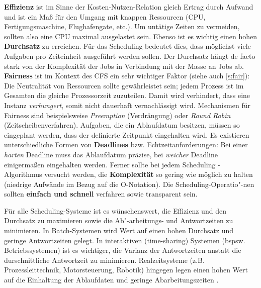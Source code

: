 \textbf{Effizienz} ist im Sinne der Kosten-Nutzen-Relation gleich Ertrag durch Aufwand und ist ein Maß für den Umgang mit knappen Ressourcen (CPU, Fertigungsmaschine, Flughafengate, etc.). Um untätige Zeiten zu vermeiden, sollten also eine CPU maximal ausgelastet sein. Ebenso ist es wichtig einen hohen \textbf{Durchsatz} zu erreichen. Für das Scheduling bedeutet dies, dass möglichst viele Aufgaben pro Zeiteinheit ausgeführt werden sollen. Der Durchsatz hängt de facto stark von der Komplexität der Jobs in Verbindung mit der Masse an Jobs ab. \textbf{Fairness} ist im Kontext des CFS ein sehr wichtiger Faktor (siehe auch \ref{s:fair}): Die Neutralität von Ressourcen sollte gewährleistet sein; jedem Prozess ist im Gesamten die gleiche Prozessorzeit zuzuteilen. Damit wird verhindert, dass eine Instanz \textit{verhungert}, somit nicht dauerhaft vernachlässigt wird. Mechanismen für Fairness sind beispielsweise \textit{Preemption} (Verdrängung) oder \textit{Round Robin} (Zeitscheibenverfahren). 
Aufgaben, die ein Ablaufdatum besitzen, müssen so eingeplant werden, dass der definierte Zeitpunkt eingehalten wird. Es existieren unterschiedliche Formen von \textbf{Deadlines} bzw. Echtzeitanforderungen: Bei einer \textit{harten} Deadline muss das Ablaufdatum präzise, bei \textit{weicher} Deadline einigermaßen eingehalten werden. Ferner sollte bei jedem Scheduling - Algorithmus versucht werden, die \textbf{Komplexität} so gering wie möglich zu halten (niedrige Aufwände im Bezug auf die O-Notation). Die Scheduling-Operatio"-nen sollten \textbf{einfach und schnell} verfahren sowie transparent sein.  

Für alle Scheduling-Systeme ist es wünschenswert, die Effizienz und den Durchsatz zu maximieren sowie  die Ab"-arbeitungs- und Antwortzeiten zu minimieren. In Batch-Systemen wird Wert auf einen hohen Durchsatz und geringe Antwortzeiten gelegt. In interaktiven (time-sharing) Systemen (bspsw. Betriebssystemen) ist es wichtiger, die Varianz der Antwortzeiten anstatt die durschnittliche Antwortzeit zu minimieren. Realzeitsysteme (z.B. Prozessleittechnik, Motorsteuerung, Robotik) hingegen legen einen hohen Wert auf die Einhaltung der Ablaufdaten und geringe Abarbeitungszeiten \cite{asilberschatz}.\\


